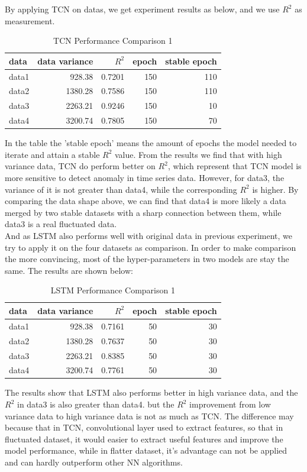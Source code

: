 By applying TCN on datas, we get experiment results as below, and we use $R^2$ as measurement.
\begin{table}[H]
\centering
\caption{TCN Performance Comparison 1}
\begin{tabular}{l r r r r}
\toprule
\textbf{data}  & \textbf{data variance}& \textbf{$R^2$} & \textbf{epoch}& \textbf{stable epoch}\\
\midrule
data1 & 928.38 & 0.7201& 150& 110\\
data2 & 1380.28 & 0.7586& 150& 110 \\
data3 & 2263.21 & 0.9246& 150& 10 \\
data4 & 3200.74 & 0.7805& 150& 70 \\
\bottomrule
\end{tabular}
\label{tab:TCN}
\end{table}

In the table the 'stable epoch' means the amount of epochs the model needed to iterate and attain a stable $R^2$ value. From the results we find that with high variance data, TCN do perform better on $R^2$, which represent that TCN model is more sensitive to detect anomaly in time series data. However, for data3, the variance of it is not greater than data4, while the corresponding $R^2$ is higher. By comparing the data shape above, we can find that data4 is more likely a data merged by two stable datasets with a sharp connection between them, while data3 is a real fluctuated data. \\
And as LSTM also performs well with original data in previous experiment, we try to apply it on the four datasets as comparison. In order to make comparison the more convincing, most of the hyper-parameters in two models are stay the same. The results are shown below:
\begin{table}[H]
\centering
\caption{LSTM Performance Comparison 1}
\begin{tabular}{l r r r r}
\toprule
\textbf{data}  & \textbf{data variance}& \textbf{$R^2$} & \textbf{epoch}& \textbf{stable epoch}\\
\midrule
data1 & 928.38 & 0.7161 & 50& 30\\
data2 & 1380.28 & 0.7637 & 50& 30 \\
data3 & 2263.21 & 0.8385 & 50& 30 \\
data4 & 3200.74 & 0.7761 & 50& 30 \\
\bottomrule
\end{tabular}
\label{tab:LSTM}
\end{table}
The results show that LSTM also performs better in high variance data, and the $R^2$ in data3 is also greater than data4. but the $R^2$ improvement from low variance data to high variance data is not as much as TCN. The difference may because that in TCN, convolutional layer used to extract features, so that in fluctuated dataset, it would easier to extract useful features and improve the model performance, while in flatter dataset, it's advantage can not be applied and can hardly outperform other NN algorithms.
